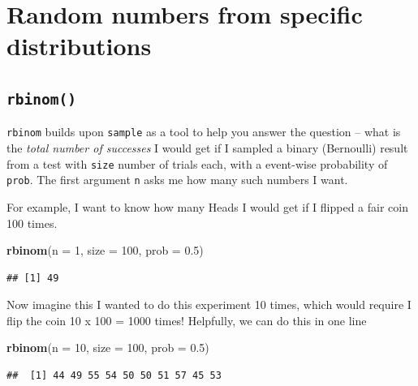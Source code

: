 \documentclass[]{book}
\newenvironment{Shaded}{\begin{snugshade}}{\end{snugshade}}
\newcommand{\KeywordTok}[1]{\textcolor[rgb]{0.13,0.29,0.53}{\textbf{#1}}}
\newcommand{\DataTypeTok}[1]{\textcolor[rgb]{0.13,0.29,0.53}{#1}}
\newcommand{\DecValTok}[1]{\textcolor[rgb]{0.00,0.00,0.81}{#1}}
\newcommand{\FloatTok}[1]{\textcolor[rgb]{0.00,0.00,0.81}{#1}}
\newcommand{\NormalTok}[1]{#1}
\theoremstyle{definition}
\theoremstyle{definition}
\theoremstyle{definition}
\theoremstyle{remark}
\begin{document}
\section{Random numbers from specific
distributions}\label{random-numbers-from-specific-distributions}

\subsection*{\texorpdfstring{\texttt{rbinom()}}{rbinom()}}\label{rbinom}

\texttt{rbinom} builds upon \texttt{sample} as a tool to help you answer
the question -- what is the \emph{total number of successes} I would get
if I sampled a binary (Bernoulli) result from a test with \texttt{size}
number of trials each, with a event-wise probability of \texttt{prob}.
The first argument \texttt{n} asks me how many such numbers I want.

For example, I want to know how many Heads I would get if I flipped a
fair coin 100 times.

\begin{Shaded}
\begin{Highlighting}[]
\KeywordTok{rbinom}\NormalTok{(}\DataTypeTok{n =} \DecValTok{1}\NormalTok{, }\DataTypeTok{size =} \DecValTok{100}\NormalTok{, }\DataTypeTok{prob =} \FloatTok{0.5}\NormalTok{)}
\end{Highlighting}
\end{Shaded}

\begin{verbatim}
## [1] 49
\end{verbatim}

Now imagine this I wanted to do this experiment 10 times, which would
require I flip the coin 10 x 100 = 1000 times! Helpfully, we can do this
in one line

\begin{Shaded}
\begin{Highlighting}[]
\KeywordTok{rbinom}\NormalTok{(}\DataTypeTok{n =} \DecValTok{10}\NormalTok{, }\DataTypeTok{size =} \DecValTok{100}\NormalTok{, }\DataTypeTok{prob =} \FloatTok{0.5}\NormalTok{)}
\end{Highlighting}
\end{Shaded}

\begin{verbatim}
##  [1] 44 49 55 54 50 50 51 57 45 53
\end{verbatim}
\end{document}
